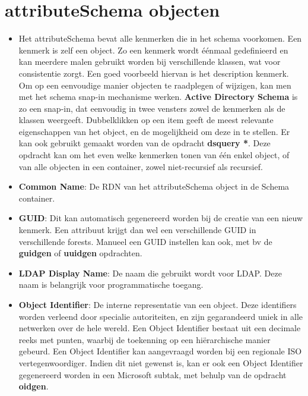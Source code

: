 \documentclass{report}
\begin{document}
	\section{attributeSchema objecten }
	\begin{enumerate}
		 { 
			\begin{itemize}
				\item Het attributeSchema bevat alle kenmerken die in het schema voorkomen. Een kenmerk is zelf een object. Zo een kenmerk wordt éénmaal gedefinieerd en kan meerdere malen gebruikt worden bij verschillende klassen, wat voor consistentie zorgt. Een goed voorbeeld hiervan is het description kenmerk. Om op een eenvoudige manier objecten te raadplegen of wijzigen, kan men met het schema snap-in mechanisme werken. \textbf{Active Directory Schema} is zo een snap-in, dat eenvoudig in twee vensters zowel de kenmerken als de klassen weergeeft. Dubbelklikken op een item geeft de meest relevante eigenschappen van het object, en de mogelijkheid om deze in te stellen. Er kan ook gebruikt gemaakt worden van de opdracht \textbf{dsquery *}. Deze opdracht kan om het even welke kenmerken tonen van één enkel object, of van alle objecten in een container, zowel niet-recursief als recursief.
			\end{itemize}
		}
		
		 { 
			\begin{itemize}
				\item \textbf{Common Name}: De RDN van het attributeSchema object in de Schema container.
				\item \textbf{GUID}: Dit kan automatisch gegenereerd worden bij de creatie van een nieuw kenmerk. Een attribuut krijgt dan wel een verschillende GUID in verschillende forests. Manueel een GUID instellen kan ook, met bv de \textbf{guidgen} of \textbf{uuidgen} opdrachten.
				\item \textbf{LDAP Display Name}: De naam die gebruikt wordt voor LDAP. Deze naam is belangrijk voor programmatische toegang.
				\item \textbf{Object Identifier}: De interne representatie van een object. Deze identifiers worden verleend door specialie autoriteiten, en zijn gegarandeerd uniek in alle netwerken over de hele wereld. Een Object Identifier bestaat uit een decimale reeks met punten, waarbij de toekenning op een hiërarchische manier gebeurd. Een Object Identifier kan aangevraagd worden bij een regionale ISO vertegenwoordiger. Indien dit niet gewenst is, kan er ook een Object Identifier gegenereerd worden in een Microsoft subtak, met behulp van de opdracht \textbf{oidgen}.
			\end{itemize}
		}
		

\end{enumerate}
\end{document}
